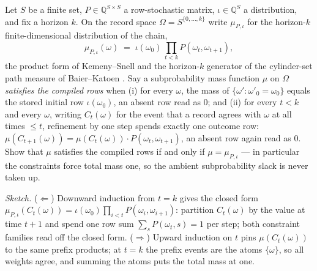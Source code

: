 \begin{problem}
\label{prob:mt-dtmc}
Let $S$ be a finite set, $P \in \mathbb{Q}^{S \times
S}$ a row-stochastic matrix, $\iota \in \mathbb{Q}^{S}$ a
distribution, and fix a horizon $k$. On the record space $\Omega =
S^{\{0,\dots,k\}}$ write $\mu_{P,\iota}$ for the horizon-$k$
finite-dimensional distribution of the chain,
\[
  \mu_{P,\iota}(\omega) \;=\; \iota(\omega_0)\,\prod_{t < k}
  P(\omega_t, \omega_{t+1}),
\]
the product form of Kemeny--Snell \cite{kemeny-snell-1960} and the
horizon-$k$ generator of the cylinder-set path measure of
Baier--Katoen \cite{baier-katoen-2008}. Say a subprobability mass
function $\mu$ on $\Omega$ \emph{satisfies the compiled rows} when
(i) for every $\omega$, the mass of $\{\omega' : \omega'_0 =
\omega_0\}$ equals the stored initial row $\iota(\omega_0)$, an
absent row read as $0$; and (ii) for every $t < k$ and every
$\omega$, writing $C_t(\omega)$ for the event that a record agrees
with $\omega$ at all times $\le t$, refinement by one step spends
exactly one outcome row:
$\mu(C_{t+1}(\omega)) = \mu(C_t(\omega)) \cdot
P(\omega_t,\omega_{t+1})$, an absent row again read as $0$. Show
that $\mu$ satisfies the compiled rows if and only if $\mu =
\mu_{P,\iota}$ --- in particular the constraints force total mass
one, so the ambient subprobability slack is never taken up.
\end{problem}

\emph{Sketch.} ($\Leftarrow$) Downward induction from $t = k$ gives
the closed form $\mu_{P,\iota}(C_t(\omega)) =
\iota(\omega_0)\prod_{i<t} P(\omega_i,\omega_{i+1})$: partition
$C_t(\omega)$ by the value at time $t+1$ and spend one row sum
$\sum_{s} P(\omega_t, s) = 1$ per step; both constraint families
read off the closed form. ($\Rightarrow$) Upward induction on $t$
pins $\mu(C_t(\omega))$ to the same prefix products; at $t = k$ the
prefix events are the atoms $\{\omega\}$, so all weights agree, and
summing the atoms puts the total mass at one.

